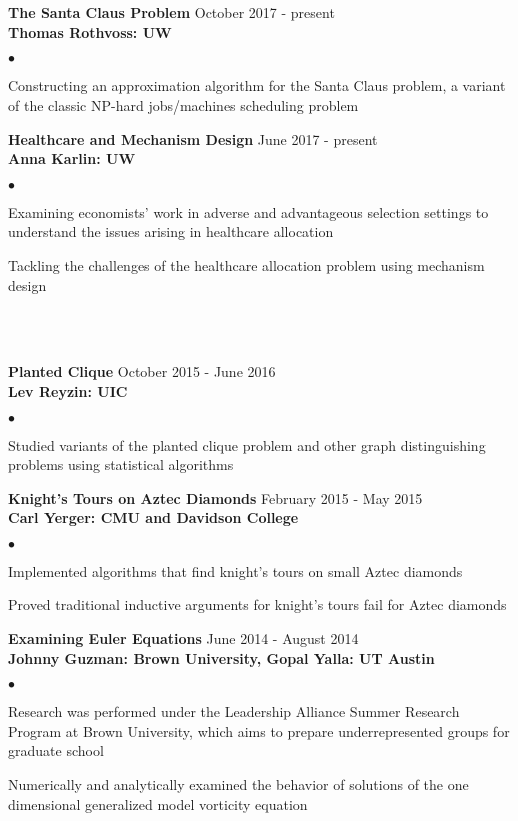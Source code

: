 \documentclass[12 pt]{article}
\newcommand{\lineunder}{\vspace*{-8pt} \\ \hspace*{-18pt} \hrulefill \\}
\newcommand{\header}[1]{{\hspace*{-15pt}\vspace*{6pt} \selectfont{\textsc{#1}}} \vspace*{-6pt} \lineunder}
\newcommand{\employer}[3]{{ \textbf{#1} \hfill #2\\ \textbf{#3}\\  }}
\newenvironment{achievements}{\begin{list}{$\bullet$}{\topsep 0pt \itemsep -2pt}}{\vspace*{4pt}\end{list}}
\begin{document}
\header{Current Projects}
\bigskip


\employer{The Santa Claus Problem}{October 2017 - present} {Thomas Rothvoss: UW}
\smallskip
	\begin{achievements}
		\item Constructing an approximation algorithm for the Santa Claus problem, a 
		variant of the classic NP-hard jobs/machines scheduling problem
	\end{achievements}
	
	
\employer{Healthcare and Mechanism Design }{June 2017 - present} {Anna Karlin: UW}
\smallskip	
\begin{achievements}
		\item Examining economists' work in adverse and advantageous selection settings to understand the
		issues arising in healthcare allocation
		\item Tackling the challenges of the healthcare allocation problem using mechanism design
	\end{achievements}
\bigskip

\header{Past Projects}
\bigskip


\employer{Planted Clique}{October 2015 - June 2016} {Lev Reyzin: UIC}
\smallskip
	\begin{achievements}
		\item Studied variants of the planted clique problem and other graph distinguishing
		 problems using statistical algorithms
	\end{achievements}
\bigskip


\employer{Knight's Tours on Aztec Diamonds }{February 2015 - May 2015} {Carl Yerger: CMU and Davidson College}
\smallskip
	\begin{achievements}
		\item Implemented algorithms that find knight's tours on small Aztec diamonds
		\item Proved traditional inductive arguments for knight's tours fail for Aztec diamonds
	\end{achievements}
\bigskip


\employer{Examining Euler Equations }{June 2014 - August 2014} {Johnny Guzman: Brown University, Gopal Yalla: UT Austin}
\smallskip

	\begin{achievements}
	\item Research was performed under the Leadership Alliance Summer Research Program at Brown University, which aims to prepare underrepresented groups for graduate school
	\item Numerically and analytically examined the behavior of solutions of the one dimensional generalized 
	model vorticity equation 
	\end{achievements}
\end{document}
